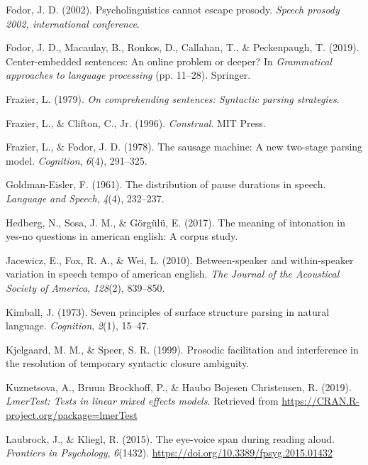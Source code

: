 \documentclass[12pt,oneside]{book}
\begin{document}
\leavevmode\hypertarget{ref-Fodor2002-io}{}%
Fodor, J. D. (2002). Psycholinguistics cannot escape prosody. \emph{Speech prosody 2002, international conference}.

\leavevmode\hypertarget{ref-fodor2019center}{}%
Fodor, J. D., Macaulay, B., Ronkos, D., Callahan, T., \& Peckenpaugh, T. (2019). Center-embedded sentences: An online problem or deeper? In \emph{Grammatical approaches to language processing} (pp. 11--28). Springer.

\leavevmode\hypertarget{ref-Frazier1979-pb}{}%
Frazier, L. (1979). \emph{On comprehending sentences: Syntactic parsing strategies}.

\leavevmode\hypertarget{ref-frazier1996construal}{}%
Frazier, L., \& Clifton, C., Jr. (1996). \emph{Construal}. MIT Press.

\leavevmode\hypertarget{ref-frazier1978sausage}{}%
Frazier, L., \& Fodor, J. D. (1978). The sausage machine: A new two-stage parsing model. \emph{Cognition}, \emph{6}(4), 291--325.

\leavevmode\hypertarget{ref-goldman1961-pa}{}%
Goldman-Eisler, F. (1961). The distribution of pause durations in speech. \emph{Language and Speech}, \emph{4}(4), 232--237.

\leavevmode\hypertarget{ref-Hedberg2017-er}{}%
Hedberg, N., Sosa, J. M., \& Görgülü, E. (2017). The meaning of intonation in yes-no questions in american english: A corpus study.

\leavevmode\hypertarget{ref-jacewicz2010-sr}{}%
Jacewicz, E., Fox, R. A., \& Wei, L. (2010). Between-speaker and within-speaker variation in speech tempo of american english. \emph{The Journal of the Acoustical Society of America}, \emph{128}(2), 839--850.

\leavevmode\hypertarget{ref-kimball1973seven}{}%
Kimball, J. (1973). Seven principles of surface structure parsing in natural language. \emph{Cognition}, \emph{2}(1), 15--47.

\leavevmode\hypertarget{ref-Kjelgaard1999-xd}{}%
Kjelgaard, M. M., \& Speer, S. R. (1999). Prosodic facilitation and interference in the resolution of temporary syntactic closure ambiguity.

\leavevmode\hypertarget{ref-R-lmerTest}{}%
Kuznetsova, A., Bruun Brockhoff, P., \& Haubo Bojesen Christensen, R. (2019). \emph{LmerTest: Tests in linear mixed effects models}. Retrieved from \url{https://CRAN.R-project.org/package=lmerTest}

\leavevmode\hypertarget{ref-evs}{}%
Laubrock, J., \& Kliegl, R. (2015). The eye-voice span during reading aloud. \emph{Frontiers in Psychology}, \emph{6}(1432). \url{https://doi.org/10.3389/fpsyg.2015.01432}
\end{document}
